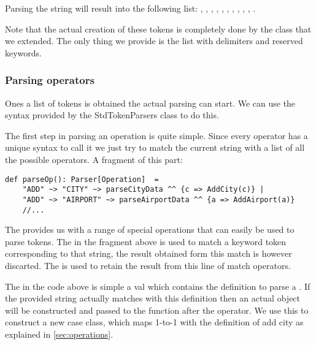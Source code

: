 \par
Parsing the string  will result into
the following list: , , , , , , , ,
, , .
 
\par
Note that the actual creation of these tokens is completely done by the
 class that we extended. The only thing we provide is the
list with delimiters and reserved keywords.


\subsubsection{Parsing operators}

Ones a list of tokens is obtained the actual parsing can start. We can use the
syntax provided by the StdTokenParsers class to do this.

\par
The first step in parsing an operation is quite simple. Since every operator
has a unique syntax to call it we just try to match the current string with
a list of all the possible operators. A fragment of this part:

\begin{lstlisting}
def parseOp(): Parser[Operation]  =
    "ADD" ~> "CITY" ~> parseCityData ^^ {c => AddCity(c)} |
    "ADD" ~> "AIRPORT" ~> parseAirportData ^^ {a => AddAirport(a)}
    //...
\end{lstlisting}

\par
The  provides us with a range of special operations
that can easily be used to parse tokens. The \sn{\textasciitilde>} in the
fragment above is used to match a keyword token corresponding to that string,
the result obtained form this match is however discarted. The
\sn{\textasciicircum\textasciicircum} is used to retain the result from this
line of match operators. 

\par
The  in the code above is simple a val which contains the
definition to parse a . If the provided string actually
matches with this definition then an actual  object will be
constructed and passed to the function after the \sn{\textasciicircum\textasciicircum}
operator. We use this to construct a new  case class, which
maps 1-to-1 with the definition of add city as explained in
\ref{sec:operations}.

